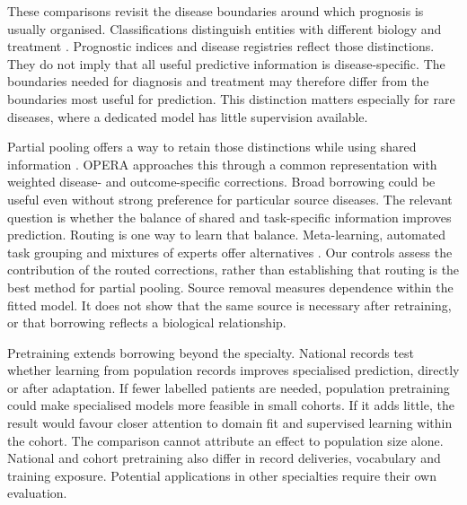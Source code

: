 These comparisons revisit the disease boundaries around which prognosis is
usually organised. Classifications distinguish entities with different biology
and treatment \citep{alaggio2022who}. Prognostic indices and disease registries
reflect those distinctions. They do not imply that all useful predictive
information is disease-specific. 
The boundaries needed for diagnosis and treatment may therefore differ from
the boundaries most useful for prediction. This distinction matters especially
for rare diseases, where a dedicated model has little supervision available.

Partial pooling offers a way to retain those distinctions while using shared
information \citep{EfronMorris1975}. OPERA approaches this through a common
representation with weighted disease- and outcome-specific corrections.
 Broad borrowing could be useful even without strong preference for
particular source diseases. The relevant question is whether the balance of
shared and task-specific information improves prediction. Routing is one way
to learn that balance. Meta-learning, automated task grouping and mixtures of
experts offer alternatives
\citep{zhang2019metapred,cui2024autodp,lee2022residualmoe,wang2025moehealth}.
Our controls assess the contribution of the routed corrections, rather than
establishing that routing is the best method for partial pooling.
Source removal measures dependence within the fitted model. It does not show
that the same source is necessary after retraining, or that borrowing reflects
a biological relationship.

Pretraining extends borrowing beyond the specialty. National records test whether learning from population records improves specialised
prediction, directly or after adaptation. 
If fewer labelled patients are needed, population pretraining could make
specialised models more feasible in small cohorts. If it adds little, the
result would favour closer attention to domain fit and supervised learning
within the cohort. The comparison cannot attribute an effect to population
size alone. National and cohort pretraining also differ in record deliveries,
vocabulary and training exposure. Potential applications in other specialties
require their own evaluation.

